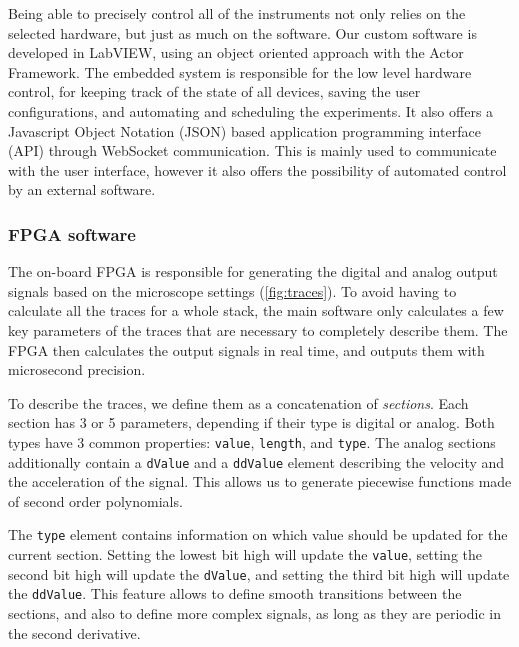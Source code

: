     Being able to precisely control all of the instruments not only relies on the selected hardware, but just as much on the software. Our custom software is developed in LabVIEW, using an object oriented approach with the Actor Framework. The embedded system is responsible for the low level hardware control, for keeping track of the state of all devices, saving the user configurations, and automating and scheduling the experiments. It also offers a Javascript Object Notation (JSON) based application programming interface (API) through WebSocket communication. This is mainly used to communicate with the user interface, however it also offers the possibility of automated control by an external software.

    \subsubsection{FPGA software}
      The on-board FPGA is responsible for generating the digital and analog output signals based on the microscope settings (\autoref{fig:traces}). To avoid having to calculate all the traces for a whole stack, the main software only calculates a few key parameters of the traces that are necessary to completely describe them. The FPGA then calculates the output signals in real time, and outputs them with microsecond precision.

      To describe the traces, we define them as a concatenation of \textit{sections}. Each section has 3 or 5 parameters, depending if their type is digital or analog. Both types have 3 common properties: \texttt{value}, \texttt{length}, and \texttt{type}. The analog sections additionally contain a \texttt{dValue} and a \texttt{ddValue} element describing the velocity and the acceleration of the signal. This allows us to generate piecewise functions made of second order polynomials.

      The \texttt{type} element contains information on which value should be updated for the current section. Setting the lowest bit high will update the \texttt{value}, setting the second bit high will update the \texttt{dValue}, and setting the third bit high will update the \texttt{ddValue}. This feature allows to define smooth transitions between the sections, and also to define more complex signals, as long as they are periodic in the second derivative.


